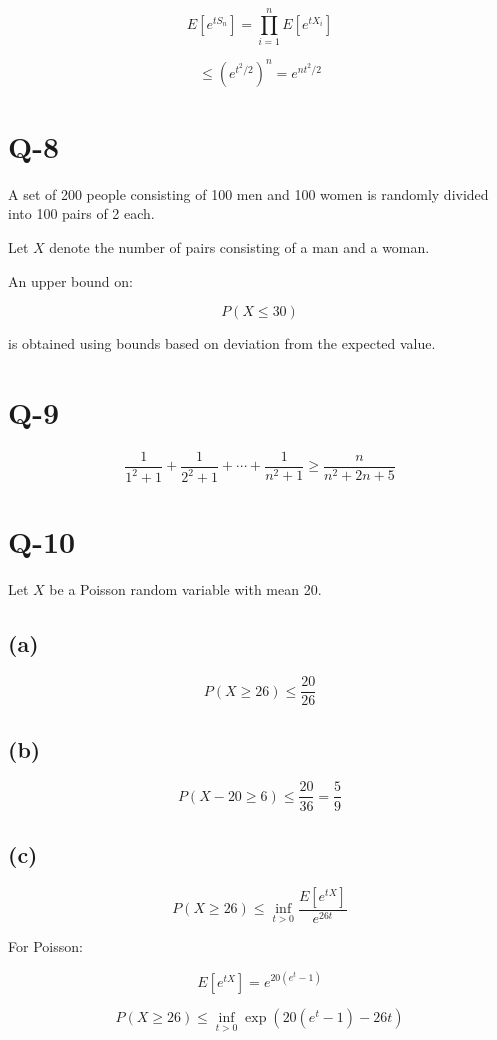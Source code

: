 \documentclass[12pt]{article}
\begin{document}
\[
E[e^{tS_n}] = \prod_{i=1}^{n} E[e^{tX_i}]
\]

\[
\le (e^{t^2/2})^n = e^{nt^2/2}
\]

\section*{Q-8}

A set of 200 people consisting of 100 men and 100 women is randomly divided into 100 pairs of 2 each.

Let $X$ denote the number of pairs consisting of a man and a woman.

An upper bound on:

\[
P(X \le 30)
\]

is obtained using bounds based on deviation from the expected value.

\section*{Q-9}

\[
\frac{1}{1^2 + 1} + \frac{1}{2^2 + 1} + \cdots + \frac{1}{n^2 + 1} \ge \frac{n}{n^2 + 2n + 5}
\]

\section*{Q-10}

Let $X$ be a Poisson random variable with mean 20.

\subsection*{(a)}

\[
P(X \ge 26) \le \frac{20}{26}
\]

\subsection*{(b)}

\[
P(X - 20 \ge 6) \le \frac{20}{36} = \frac{5}{9}
\]

\subsection*{(c)}

\[
P(X \ge 26) \le \inf_{t>0} \frac{E[e^{tX}]}{e^{26t}}
\]

For Poisson:

\[
E[e^{tX}] = e^{20(e^t - 1)}
\]

\[
P(X \ge 26) \le \inf_{t>0} \exp\left(20(e^t - 1) - 26t\right)
\]
\end{document}
